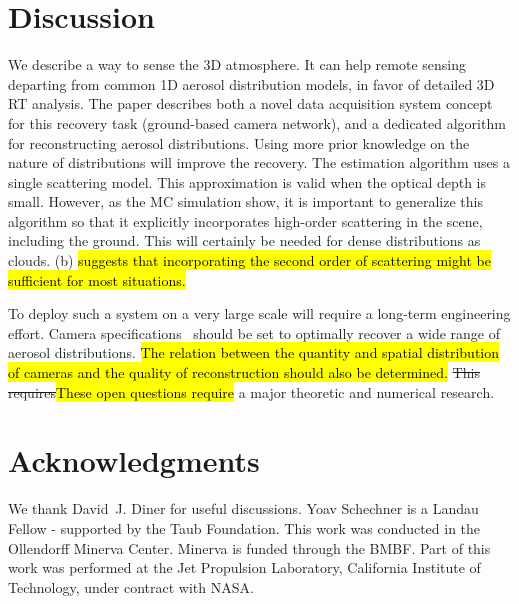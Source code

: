 \documentclass[10pt,letterpaper]{article}
\newcommand{\fix}[2]{\st{#1}\hl{#2}}
\begin{document}

\section{Discussion}
\label{sec:conclusions}

We describe a way to sense the 3D atmosphere. It can help remote
sensing departing from common 1D aerosol distribution models, in favor
of detailed 3D RT analysis.  The paper describes both a novel data
acquisition system concept for this recovery task (ground-based camera
network), and a dedicated algorithm for reconstructing aerosol
distributions. Using more prior knowledge on the nature of
distributions will improve the recovery.  The estimation algorithm
uses a single scattering model. This approximation is valid when the
optical depth is small. However, as the MC simulation show, it is
important to generalize this algorithm so that it explicitly
incorporates high-order scattering in the scene, including the
ground. This will certainly be needed for dense distributions as
clouds. (b) \hl{suggests that incorporating
the second order of scattering might be sufficient for most situations.}

To deploy such a system on a very large scale will require a long-term
engineering effort. Camera specifications~\cite{Pust2011} should be
set to optimally recover a wide range of aerosol distributions.
\hl{The relation between the quantity and spatial distribution of
  cameras and the quality of reconstruction should also be determined.}
\fix{This requires}{These open questions require} a major theoretic
 and numerical research.


\section*{Acknowledgments}
\label{sec:acknowledgments}

We thank David~J. Diner for useful discussions. Yoav Schechner is a
Landau Fellow - supported by the Taub Foundation. This work was
conducted in the Ollendorff Minerva Center. Minerva is funded through
the BMBF. Part of this work was performed at the Jet Propulsion
Laboratory, California Institute of Technology, under contract with
NASA.
\end{document}
